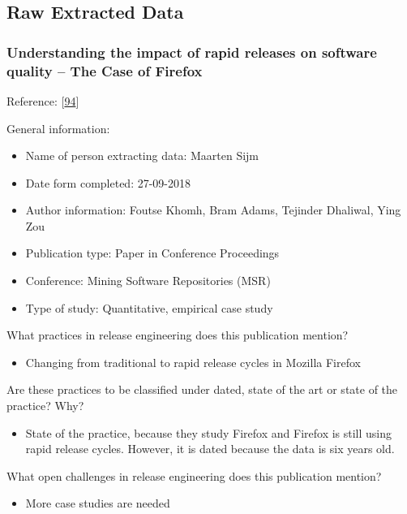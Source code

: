 \documentclass[]{book}
\providecommand{\tightlist}{%
  \setlength{\itemsep}{0pt}\setlength{\parskip}{0pt}}
\begin{document}
\subsection{Raw Extracted Data}\label{raw-extracted-data}

\subsubsection{Understanding the impact of rapid releases on software
quality -- The Case of
Firefox}\label{understanding-the-impact-of-rapid-releases-on-software-quality-the-case-of-firefox}

Reference: {[}\protect\hyperlink{ref-khomh2015a}{94}{]}

General information:

\begin{itemize}
\tightlist
\item
  Name of person extracting data: Maarten Sijm
\item
  Date form completed: 27-09-2018
\item
  Author information: Foutse Khomh, Bram Adams, Tejinder Dhaliwal, Ying
  Zou
\item
  Publication type: Paper in Conference Proceedings
\item
  Conference: Mining Software Repositories (MSR)
\item
  Type of study: Quantitative, empirical case study
\end{itemize}

What practices in release engineering does this publication mention?

\begin{itemize}
\tightlist
\item
  Changing from traditional to rapid release cycles in Mozilla Firefox
\end{itemize}

Are these practices to be classified under dated, state of the art or
state of the practice? Why?

\begin{itemize}
\tightlist
\item
  State of the practice, because they study Firefox and Firefox is still
  using rapid release cycles. However, it is dated because the data is
  six years old.
\end{itemize}

What open challenges in release engineering does this publication
mention?

\begin{itemize}
\tightlist
\item
  More case studies are needed
\end{itemize}
\end{document}
